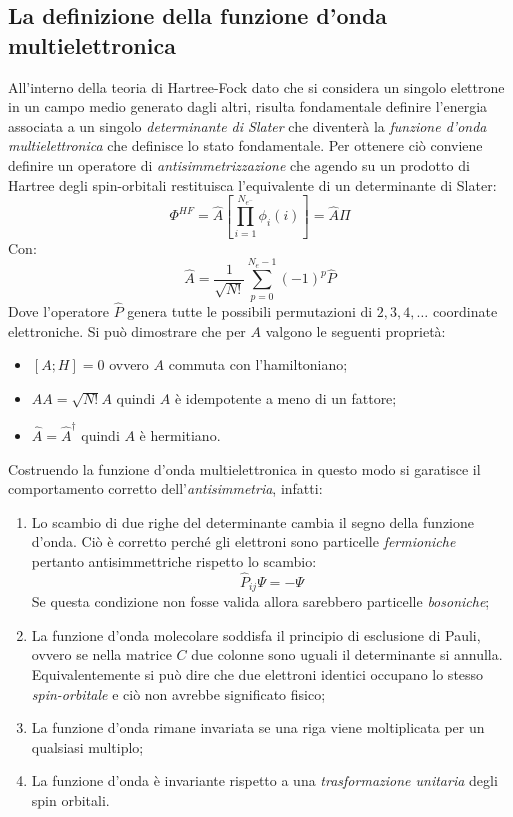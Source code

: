 \documentclass[oneside]{amsbook}
\numberwithin{section}{chapter}
\numberwithin{equation}{section}
\numberwithin{figure}{section}
\begin{document}
\subsection{La definizione della funzione d'onda multielettronica}
All'interno della teoria di Hartree-Fock dato che si considera un singolo elettrone in un campo medio generato dagli altri, risulta fondamentale definire l'energia associata a un singolo \emph{determinante di Slater} che diventerà la \emph{funzione d'onda multielettronica} che definisce lo stato fondamentale.  Per ottenere ciò conviene definire un operatore di \emph{antisimmetrizzazione} che agendo su un prodotto di Hartree degli spin-orbitali restituisca l'equivalente di un determinante di Slater:
\begin{equation}
\Phi^{HF}=\hat{A}\left[\prod \limits _{i=1} ^{N_{e^-}} \phi_i (i)\right]=\hat{A}\Pi
\end{equation}
Con:
\begin{equation}
\label{A}
\hat{A}= \frac{1}{\sqrt{N!}}\sum \limits_{p=0} ^{N_e-1} (-1)^p \hat{P}
\end{equation}
Dove l'operatore $\hat{P}$ genera tutte le possibili permutazioni di $2,3,4,\ldots$ coordinate elettroniche.
Si può dimostrare che per $A$ valgono le seguenti proprietà:
\begin{itemize}
\item $[A;H]=0$ ovvero $A$ commuta con l'hamiltoniano;
\item $AA=\sqrt{N!}A$ quindi $A$ è idempotente a meno di un fattore;
\item $\hat{A}=\hat{A}^{\dagger}$ quindi $A$ è hermitiano.
\end{itemize}
Costruendo la funzione d'onda multielettronica in questo modo si garatisce il comportamento corretto dell'\emph{antisimmetria}, infatti:
\begin{enumerate}
\item Lo scambio di due righe del determinante cambia il segno  della funzione d'onda. Ciò è corretto perché gli elettroni sono particelle \emph{fermioniche} pertanto antisimmettriche rispetto lo scambio:
$$\hat{P}_{ij}\Psi=-\Psi$$
Se questa condizione non fosse valida allora sarebbero particelle \emph{bosoniche};
\item La funzione d'onda molecolare soddisfa il principio di esclusione di Pauli, ovvero se nella matrice $C$ due colonne sono uguali il determinante si annulla. Equivalentemente si può dire che due elettroni identici occupano lo stesso \emph{spin-orbitale} e ciò non avrebbe significato fisico;
\item La funzione d'onda rimane invariata se una riga viene moltiplicata per un qualsiasi multiplo;
\item La funzione d'onda è invariante rispetto a una \emph{trasformazione unitaria} degli spin orbitali.
\end{enumerate}
\end{document}
